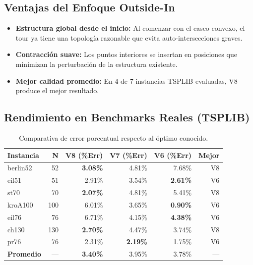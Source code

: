 \documentclass[12pt, a4paper]{article}
\begin{document}
\subsection{Ventajas del Enfoque Outside-In}
\begin{itemize}
    \item \textbf{Estructura global desde el inicio:} Al comenzar con el casco convexo, el tour ya tiene una topología razonable que evita auto-intersecciones graves.
    \item \textbf{Contracción suave:} Los puntos interiores se insertan en posiciones que minimizan la perturbación de la estructura existente.
    \item \textbf{Mejor calidad promedio:} En 4 de 7 instancias TSPLIB evaluadas, V8 produce el mejor resultado.
\end{itemize}

\subsection{Rendimiento en Benchmarks Reales (TSPLIB)}

\begin{table}[h]
    \centering
    \begin{tabular}{lrrrrr}
        \toprule
        Instancia & N & V8 (\%Err) & V7 (\%Err) & V6 (\%Err) & Mejor \\
        \midrule
        berlin52 & 52 & \textbf{3.08\%} & 4.81\% & 7.68\% & V8 \\
        eil51 & 51 & 2.91\% & 3.54\% & \textbf{2.61\%} & V6 \\
        st70 & 70 & \textbf{2.07\%} & 4.81\% & 5.41\% & V8 \\
        kroA100 & 100 & 6.01\% & 3.65\% & \textbf{0.90\%} & V6 \\
        eil76 & 76 & 6.71\% & 4.15\% & \textbf{4.38\%} & V6 \\
        ch130 & 130 & \textbf{2.70\%} & 4.47\% & 3.74\% & V8 \\
        pr76 & 76 & 2.31\% & \textbf{2.19\%} & 1.75\% & V6 \\
        \midrule
        \textbf{Promedio} & --- & \textbf{3.40\%} & 3.95\% & 3.78\% & --- \\
        \bottomrule
    \end{tabular}
    \caption{Comparativa de error porcentual respecto al óptimo conocido.}
\end{table}
\end{document}
